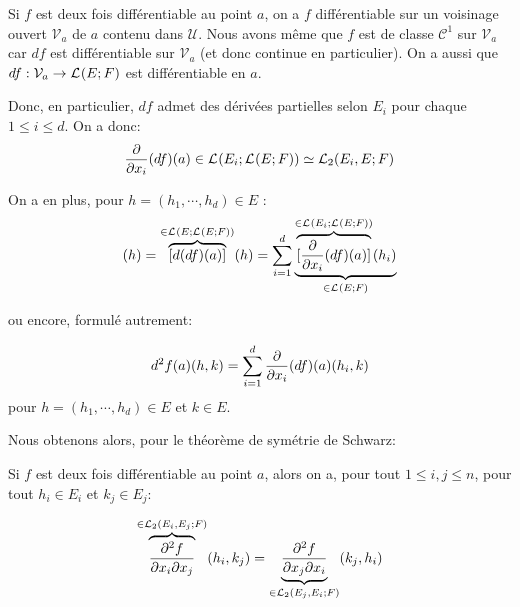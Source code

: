 \begin{remarque}
	Si $f$ est deux fois différentiable au point $a$, on a $f$ différentiable
	sur un voisinage ouvert $\mathcal{V}_{a}$ de $a$ contenu dans $\mathcal{U}$.
	Nous avons même que $f$ est de classe $\mathcal{C}^{1}$ sur
	$\mathcal{V}_{a}$ car $df$ est différentiable sur $\mathcal{V}_{a}$ (et donc
	continue en particulier).
	On a aussi que $df : \mathcal{V}_{a} \rightarrow \GScontinueHomo{E}{F}$ est
	différentiable en $a$.

	Donc, en particulier, $df$ admet des dérivées partielles selon $E_{i}$ pour
	chaque $1 \leq i \leq d$.
	On a donc:
	\begin{equation*}
		\pdv{x_{i}} (df)(a) \in \GScontinueHomo{E_{i}}{\GScontinueHomo{E}{F}}
		\identification \GScontinueHomo[2]{E_{i}, E}{F}
	\end{equation*}

	On a en plus, pour $h = (h_{1}, \cdots, h_{d}) \in E$ :
	\begin{equation*}
		[d^{2}f(a)](h) = \overbrace{[d(df)(a)]}^{\in \GScontinueHomo{E}{\GScontinueHomo{E}{F}}} (h) = \displaystyle \sum_{i = 1}^{d} \underbrace{\overbrace{[\pdv{x_{i}}
		(df)(a)]}^{\in \GScontinueHomo{E_{i}}{\GScontinueHomo{E}{F}}}
		(h_{i})}_{\in \GScontinueHomo{E}{F}}
	\end{equation*}

	ou encore, formulé autrement:

	\begin{equation*}
		d^{2}f(a)(h, k) = \displaystyle \sum_{i = 1}^{d} \pdv{x_{i}}
		(df)(a)(h_{i}, k)
	\end{equation*}
	pour $h = (h_{1}, \cdots, h_{d}) \in E$ et $k \in E$.
\end{remarque}

Nous obtenons alors, pour le théorème de symétrie de Schwarz:

\begin{theorem}
	Si $f$ est deux fois différentiable au point $a$, alors on a, pour tout $1
	\leq i, j \leq n$, pour tout $h_{i} \in E_{i}$ et $k_{j} \in E_{j}$:

	\begin{equation}
		\overbrace{\pdv{f}{x_{i}}{x_{j}} (a)}^{\in \GScontinueHomo[2]{E_{i},
		E_{j}}{F}} (h_{i}, k_{j}) = \underbrace{\pdv{f}{x_{j}}{x_{i}} (a)}_{\in
			\GScontinueHomo[2]{E_{j}, E_{i}}{F}}
		(k_{j}, h_{i})
	\end{equation}
\end{theorem}

